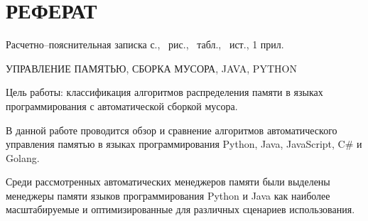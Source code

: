 \part*{РЕФЕРАТ}

Расчетно--пояснительная записка \pageref{LastPage} с., \totalfigures\ рис., \totaltables\ табл., \thetotalbibentries\ ист., 1 прил.

УПРАВЛЕНИЕ ПАМЯТЬЮ, СБОРКА МУСОРА, JAVA, PYTHON

Цель работы: классификация алгоритмов распределения памяти в языках программирования с автоматической сборкой мусора.

В данной работе проводится обзор и сравнение алгоритмов автоматического управления памятью в языках программирования Python, Java, JavaScript, C\# и Golang.

Среди рассмотренных автоматических менеджеров памяти были выделены менеджеры памяти языков программирования Python и Java как наиболее масштабируемые и оптимизированные для различных сценариев использования.

